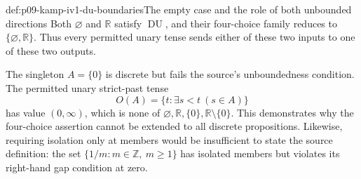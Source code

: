 \begin{hbexample}{def:p09-kamp-iv1-du-boundaries}{The empty case and the role of both unbounded directions}
Both \(\varnothing\) and \(\mathbb R\) satisfy
\(\operatorname{DU}\), and their four-choice family reduces to
\(\{\varnothing,\mathbb R\}\). Thus every permitted unary
tense sends either of these two inputs to one of these two outputs.

The singleton \(A=\{0\}\) is discrete but fails the source's
unboundedness condition. The permitted unary strict-past tense
\[
 O(A)=\{t:\exists s<t\ (s\in A)\}
\]
has value \((0,\infty)\), which is none of
\(\varnothing,\mathbb R,\{0\},\mathbb R\setminus\{0\}\).
This demonstrates why the four-choice assertion cannot be extended to
all discrete propositions. Likewise, requiring isolation only at members
would be insufficient to state the source definition: the set
\(\{1/m:m\in\mathbb Z,\ m\geq1\}\) has isolated members
but violates its right-hand gap condition at zero.
\end{hbexample}
